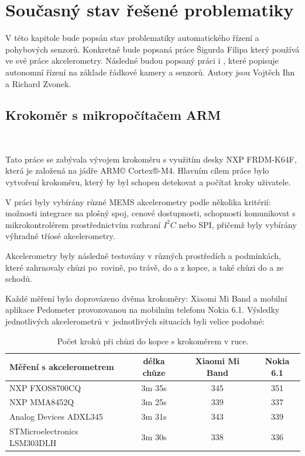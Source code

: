 \chapter{Současný stav řešené problematiky}
\label{sec:Theory}
\vspace{-20pt}

V této kapitole bude popsán stav problematiky automatického řízení a pohybových senzorů. Konkretně bude popsaná práce  Šigurda Filipa který používá ve své práce akcelerometry. Následné budou popsaný práci  i , které popisuje autonomní řízení na základe řádkové kamery a senzorů. Autory jsou Vojtěch Ihn a Richard Zvonek.

\section{Krokoměr s mikropočítačem ARM}\

Tato práce se zabývala vývojem krokoměru s využitím desky NXP FRDM-K64F, která je založená na jádře ARM© Cortex®-M4. Hlavním cílem práce bylo vytvoření krokoměru, který by byl schopen detekovat a počítat kroky uživatele.

V práci byly vybírány různé MEMS akcelerometry podle několika kritérií: možnosti integrace na plošný spoj, cenové dostupnosti, schopnosti komunikovat s mikrokontrolérem prostřednictvím rozhraní $I^2C$ nebo SPI, přičemž byly vybírány výhradně tříosé akcelerometry.

Akcelerometry byly následně testovány v různých prostředích a podmínkách, které zahrnovaly chůzi po~rovině, po trávě, do a z kopce, a také chůzi do a ze schodů.

Každé měření bylo doprovázeno dvěma krokoměry:  Xiaomi Mi Band a mobilní aplikace Pedometer provozovanou na mobilním telefonu Nokia 6.1. Výsledky jednotlivých akcelerometrů v~jednotlivých situacích byli velice podobné:

\begin{table}[!htbp]
	\centering
	\begin{tabular}{lccc}
		\toprule
		Měření s akcelerometrem      & délka chůze & Xiaomi Mi Band & Nokia 6.1 \\
		\midrule
		NXP FXOS8700CQ               & 3m 35s      & 345            & 351       \\
		NXP MMA8452Q                 & 3m 25s      & 339            & 337       \\
		Analog Devices ADXL345       & 3m 31s      & 343            & 339       \\
		STMicroelectronics LSM303DLH & 3m 30s      & 338            & 336       \\
		\bottomrule
	\end{tabular}
	\caption{Počet kroků při chůzi do kopce s krokoměrem v ruce.}
	\label{tab:1}
	\vspace{-15pt}
\end{table}

